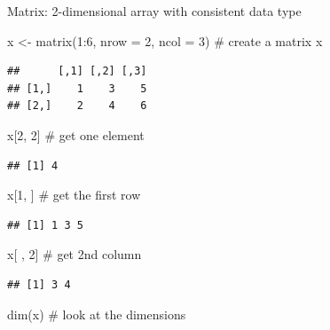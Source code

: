 \documentclass[
  9pt,
  ignorenonframetext,
]{beamer}
\newenvironment{Shaded}{\begin{snugshade}}{\end{snugshade}}
\newcommand{\CommentTok}[1]{\textcolor[rgb]{0.50,0.62,0.50}{#1}}
\newcommand{\DataTypeTok}[1]{\textcolor[rgb]{0.87,0.87,0.75}{#1}}
\newcommand{\DecValTok}[1]{\textcolor[rgb]{0.86,0.86,0.80}{#1}}
\newcommand{\KeywordTok}[1]{\textcolor[rgb]{0.94,0.87,0.69}{#1}}
\newcommand{\NormalTok}[1]{\textcolor[rgb]{0.80,0.80,0.80}{#1}}
\newcommand{\OperatorTok}[1]{\textcolor[rgb]{0.94,0.94,0.82}{#1}}
\newcommand{\StringTok}[1]{\textcolor[rgb]{0.80,0.58,0.58}{#1}}
\begin{document}
\begin{frame}[fragile]{Matrix: 2-dimensional array with consistent data
type}
\protect\hypertarget{matrix-2-dimensional-array-with-consistent-data-type}{}
\footnotesize

\begin{Shaded}
\begin{Highlighting}[]
\NormalTok{x \textless{}{-}}\StringTok{ }\KeywordTok{matrix}\NormalTok{(}\DecValTok{1}\OperatorTok{:}\DecValTok{6}\NormalTok{, }\DataTypeTok{nrow =} \DecValTok{2}\NormalTok{, }\DataTypeTok{ncol =} \DecValTok{3}\NormalTok{) }\CommentTok{\# create a matrix}
\NormalTok{x}
\end{Highlighting}
\end{Shaded}

\begin{verbatim}
##      [,1] [,2] [,3]
## [1,]    1    3    5
## [2,]    2    4    6
\end{verbatim}

\begin{Shaded}
\begin{Highlighting}[]
\NormalTok{x[}\DecValTok{2}\NormalTok{, }\DecValTok{2}\NormalTok{] }\CommentTok{\# get one element}
\end{Highlighting}
\end{Shaded}

\begin{verbatim}
## [1] 4
\end{verbatim}

\begin{Shaded}
\begin{Highlighting}[]
\NormalTok{x[}\DecValTok{1}\NormalTok{, ]  }\CommentTok{\# get the first row}
\end{Highlighting}
\end{Shaded}

\begin{verbatim}
## [1] 1 3 5
\end{verbatim}

\begin{Shaded}
\begin{Highlighting}[]
\NormalTok{x[ , }\DecValTok{2}\NormalTok{] }\CommentTok{\# get 2nd column}
\end{Highlighting}
\end{Shaded}

\begin{verbatim}
## [1] 3 4
\end{verbatim}

\begin{Shaded}
\begin{Highlighting}[]
\KeywordTok{dim}\NormalTok{(x)  }\CommentTok{\# look at the dimensions}
\end{Highlighting}
\end{Shaded}


\end{frame}
\end{document}
